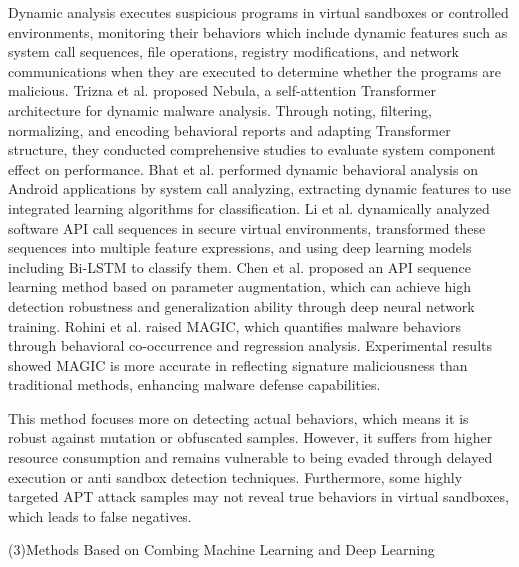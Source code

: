 Dynamic analysis executes suspicious programs in virtual sandboxes or controlled environments, monitoring their behaviors which include dynamic features such as system call sequences, file operations, registry modifications, and network communications when they are executed to determine whether the programs are malicious. Trizna et al. proposed Nebula, a self-attention Transformer architecture for dynamic malware analysis\cite{trizna2024nebula}. Through noting, filtering, normalizing, and encoding behavioral reports and adapting Transformer structure, they conducted comprehensive studies to evaluate system component effect on performance. Bhat et al. performed dynamic behavioral analysis on Android applications by system call analyzing, extracting dynamic features to use integrated learning algorithms for classification\cite{bhat2023system}. Li et al. dynamically analyzed software API call sequences in secure virtual environments, transformed these sequences into multiple feature expressions, and using deep learning models including Bi-LSTM to classify them\cite{li2022novel}. Chen et al. proposed an API sequence learning method based on parameter augmentation, which can achieve high detection robustness and generalization ability through deep neural network training\cite{chen2022cruparamer}. Rohini et al. raised MAGIC, which quantifies malware behaviors through behavioral co-occurrence and regression analysis\cite{rohini2024magic}. Experimental results showed MAGIC is more accurate in reflecting signature maliciousness than traditional methods, enhancing malware defense capabilities.

This method focuses more on detecting actual behaviors, which means it is robust against mutation or obfuscated samples. However, it suffers from higher resource consumption and remains vulnerable to being evaded through delayed execution or anti sandbox detection techniques. Furthermore, some highly targeted APT attack samples may not reveal true behaviors in virtual sandboxes, which leads to false negatives.

(3)Methods Based on Combing Machine Learning and Deep Learning

